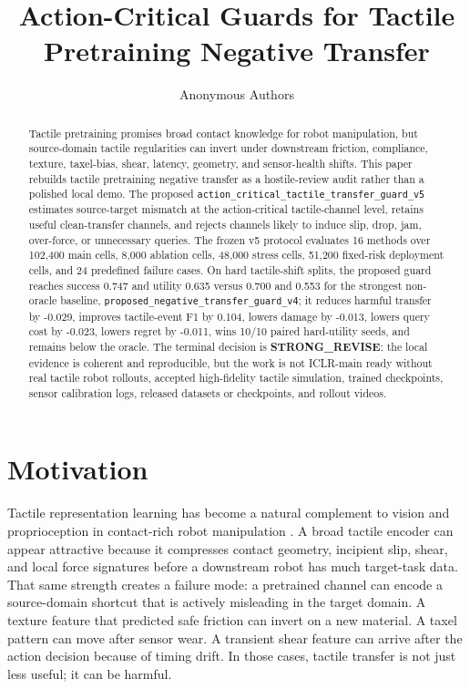 \documentclass{article}
\title{Action-Critical Guards for Tactile Pretraining Negative Transfer}
\author{Anonymous Authors}
\begin{document}
\maketitle

\begin{abstract}
Tactile pretraining promises broad contact knowledge for robot manipulation, but source-domain tactile regularities can invert under downstream friction, compliance, texture, taxel-bias, shear, latency, geometry, and sensor-health shifts. This paper rebuilds tactile pretraining negative transfer as a hostile-review audit rather than a polished local demo. The proposed \texttt{action\_critical\_tactile\_transfer\_guard\_v5} estimates source-target mismatch at the action-critical tactile-channel level, retains useful clean-transfer channels, and rejects channels likely to induce slip, drop, jam, over-force, or unnecessary queries. The frozen v5 protocol evaluates 16 methods over 102,400 main cells, 8,000 ablation cells, 48,000 stress cells, 51,200 fixed-risk deployment cells, and 24 predefined failure cases. On hard tactile-shift splits, the proposed guard reaches success 0.747 and utility 0.635 versus 0.700 and 0.553 for the strongest non-oracle baseline, \texttt{proposed\_negative\_transfer\_guard\_v4}; it reduces harmful transfer by -0.029, improves tactile-event F1 by 0.104, lowers damage by -0.013, lowers query cost by -0.023, lowers regret by -0.011, wins 10/10 paired hard-utility seeds, and remains below the oracle. The terminal decision is \textbf{STRONG\_REVISE}: the local evidence is coherent and reproducible, but the work is not ICLR-main ready without real tactile robot rollouts, accepted high-fidelity tactile simulation, trained checkpoints, sensor calibration logs, released datasets or checkpoints, and rollout videos.
\end{abstract}

\section{Motivation}
Tactile representation learning has become a natural complement to vision and proprioception in contact-rich robot manipulation \citep{calandra2017more,lee2019making,lambeta2020digit,yuan2017gelsight}. A broad tactile encoder can appear attractive because it compresses contact geometry, incipient slip, shear, and local force signatures before a downstream robot has much target-task data. That same strength creates a failure mode: a pretrained channel can encode a source-domain shortcut that is actively misleading in the target domain. A texture feature that predicted safe friction can invert on a new material. A taxel pattern can move after sensor wear. A transient shear feature can arrive after the action decision because of timing drift. In those cases, tactile transfer is not just less useful; it can be harmful.
\end{document}
